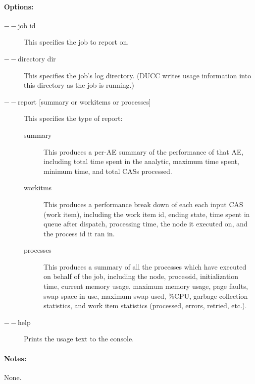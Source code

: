     \paragraph{Options:}
    \begin{description}
        \item[$--$job id] This specifies the job to report on.
        \item[$--$directory dir] This specifies the job's log directory. (DUCC writes usage information into this
          directory as the job is running.)
        \item[$--$report {[summary or workitems or processes]}]
          This specifies the type of report:
          \begin{description}
              \item[summary] This produces a per-AE summary of the performance of that AE, including
                total time spent in the analytic, maximum time spent, minimum time, and total CASs
                processed.
              \item[workitms] This produces a performance break down of each each input CAS (work
                item), including the work item id, ending state, time spent in queue after dispatch,
                processing time, the node it executed on, and the process id it ran in.
              \item[processes] This produces a summary of all the processes which have executed on
                behalf of the job, including the node, processid, initialization time, current memory usage,
                maximum memory usage, page faults, swap space in use, maximum swap used, \%CPU,
                garbage collection statistics, and work item statistics (processed, errors, retried, etc.).
          \end{description}
        \item[$--$help] Prints the usage text to the console. 
     \end{description}
        
    \paragraph{Notes:}
    None.

